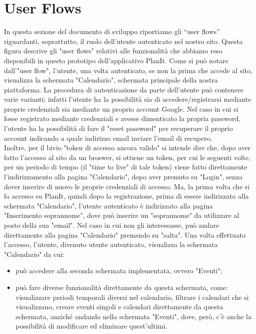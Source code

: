 \section{User Flows}
\label{secD4:UserFlows}

In questa sezione del documento di sviluppo riportiamo gli “user flows” riguardanti, soprattutto, il ruolo dell'utente autenticato nel nostro sito.
Questa figura descrive gli "user flows" relativi alle funzionalità che abbiamo reso disponibili in questo prototipo dell'applicativo PlanIt. Come si può notare dall'"user flow", l'utente, una volta autenticato, se non la prima che accede al sito, visualizza la schermata "Calendario", schermata principale della nostra piattaforma. La procedura di autenticazione da parte dell'utente può contenere varie varianti; infatti l'utente ha la possibilità sia di accedere/registrarsi mediante proprie credenziali sia mediante un proprio account Google. Nel caso in cui si fosse registrato mediante credenziali e avesse dimenticato la propria password, l'utente ha la possibilità di fare il "reset password" per recuperare il proprio account indicando a quale indirizzo email inviare l'email di recupero. \\ Inoltre, per il bivio "token di accesso ancora valido" si intende dire che, dopo aver fatto l'accesso al sito da un broswer, si ottiene un token, per cui le seguenti volte, per un periodo di tempo (il "time to live" di tale token) viene fatto direttamente l'indirizzamento alla pagina "Calendario", dopo aver premuto su "Login", senza dover inserire di nuovo le proprie credenziali di accesso. Ma, la prima volta che si fa accesso su PlanIt, quindi dopo la registrazione, prima di essere indirizzato alla schermata "Calendario", l'utente autenticato è indirizzato alla pagina "Inserimento soprannome", dove può inserire un "soprannome" da utilizzare al posto della sua "email". Nel caso in cui non gli interessasse, può andare direttamente alla pagina "Calendario" premendo su "salta".
Una volta effettuato l'accesso, l'utente, divenuto utente autenticato, visualizza la schermata "Calendario" da cui:
\begin{itemize}
    \item può accedere alla seconda schermata implementata, ovvero "Eventi";
    \item può fare diverse funzionalità direttamente da questa schermata, come: visualizzare periodi temporali diversi nel calendario, filtrare i calendari che si visualizzano, creare eventi singoli e calendari direttamente da questa schermata, anziché andando nella schermata "Eventi", dove, però, c'è anche la possibilità di modificare ed eliminare quest'ultimi.
    \begin{comment}
    e creare eventi ripetuti, ovvero eventi che, già in tempo di compilazione di questi, sono definiti su più giorni.
    \end{comment}
\end{itemize}
